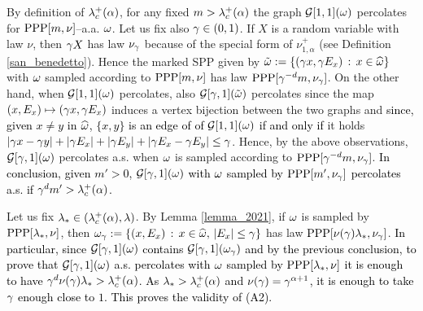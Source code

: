 \documentclass[12pt,a4paper,reqno]{amsart}
\newcommand{\cG}{\ensuremath{\mathcal G}}
\let\a=\alpha \let\b=\beta   \let\d=\delta  \let\e=\varepsilon
\newcommand{\orc}{\textcolor{black}} %
\newcommand{\be}{\begin{equation}}
\newcommand{\en}{\end{equation}}
\begin{document}
By definition of $\l_c^+(\a)$, for any fixed $m> \l_c^+(\a)$ the graph $\cG[1, 1] (\o)$ percolates for  ${\rm PPP}[m,\nu]$--a.a. $\omega$. 
Let us fix also  $\gamma\in (0,1)$. If $X$ is a random variable with law $\nu$, then   $\gamma X$ has law  $\nu_\gamma$ because of  the special form of $\nu_{1,\a}^+$ (see Definition \ref{san_benedetto}). Hence the marked SPP given by $\tilde {\omega}:=\{ (\gamma x, \gamma E_x)\,:\, x\in \widehat {\omega}\}$  with $\omega$ sampled according to ${\rm PPP}[m,\nu]$ has law ${\rm PPP}[ \gamma^{-d} m, \nu_\gamma]$. On the other hand, when $\cG[1, 1] (\o)$ percolates, also $\cG[\g, 1](\tilde \o)$ percolates since  the map $(x,E_x) \mapsto (\gamma x, \gamma E_x)$ induces a vertex bijection between the two graphs
 and \orc{since, given $x\not= y$ in $\widehat{\omega}$,   $\{x,y\}$ is an edge of of $\cG[1, 1] (\o)$ if and only if}  it holds 
$|\gamma x- \gamma y| + |\gamma E_x|+|\gamma E_y|+|\gamma E_x- \gamma E_y| \leq \gamma $.
Hence, by the above observations, \orc{$\cG[\g, 1] (\o)$} percolates a.s. when \orc{$\omega$}  is sampled according to ${\rm PPP}[ \gamma^{-d} m, \nu_\gamma]$. \orc{In conclusion, given $m'>0$, $\cG[\g, 1] (\o)$ with $\omega$ sampled by ${\rm PPP}[m',\nu_\gamma]$ percolates a.s. if $\g^d m'>\l_c^+(\a)$.}


Let us fix $\l_*\in (\l_c^+(\a),\l)$.
By Lemma \ref{lemma_2021}, if $\omega $ is sampled by ${\rm PPP}[\lambda_*, \nu]$, then $\omega_\gamma:=\{(x,E_x)\,: \, x\in \widehat{\omega},\, |E_x|\leq \gamma\}$
 has law ${\rm PPP} [\nu(\gamma) \lambda_*, \nu_\gamma]$.  \orc{In particular, since $\cG[\g,1](\o)$  contains $\cG[\g,1](\o_\g)$ and by the previous conclusion,
 to prove that  $\cG[\g,1](\o)$ a.s. percolates with $\omega$ sampled by ${\rm PPP}[\lambda_*, \nu]$ it is enough to have  $\g^d \nu(\g) \l_*>\l_c^+(\a)$. As $ \l_*>\l_c^+(\a)$ and $\nu(\g)=\g^{\a+1}$, it is enough to take $\gamma$ enough close to $1$. This proves the validity of  (A2).}
%
%
\end{document}
